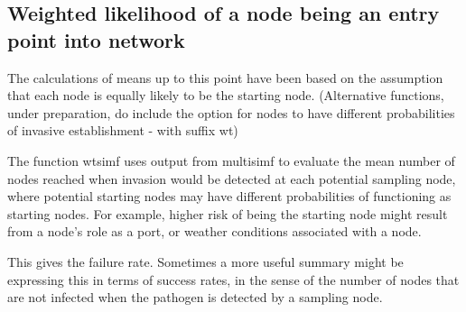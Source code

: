\documentclass[]{article}
\newenvironment{Shaded}{\begin{snugshade}}{\end{snugshade}}
\newcommand{\KeywordTok}[1]{\textcolor[rgb]{0.13,0.29,0.53}{\textbf{#1}}}
\newcommand{\DataTypeTok}[1]{\textcolor[rgb]{0.13,0.29,0.53}{#1}}
\newcommand{\DecValTok}[1]{\textcolor[rgb]{0.00,0.00,0.81}{#1}}
\newcommand{\StringTok}[1]{\textcolor[rgb]{0.31,0.60,0.02}{#1}}
\newcommand{\CommentTok}[1]{\textcolor[rgb]{0.56,0.35,0.01}{\textit{#1}}}
\newcommand{\OtherTok}[1]{\textcolor[rgb]{0.56,0.35,0.01}{#1}}
\newcommand{\ControlFlowTok}[1]{\textcolor[rgb]{0.13,0.29,0.53}{\textbf{#1}}}
\newcommand{\OperatorTok}[1]{\textcolor[rgb]{0.81,0.36,0.00}{\textbf{#1}}}
\newcommand{\NormalTok}[1]{#1}
\begin{document}
\subsection{Weighted likelihood of a node being an entry point into
network}\label{weighted-likelihood-of-a-node-being-an-entry-point-into-network}

The calculations of means up to this point have been based on the
assumption that each node is equally likely to be the starting node.
(Alternative functions, under preparation, do include the option for
nodes to have different probabilities of invasive establishment - with
suffix wt)

The function wtsimf uses output from multisimf to evaluate the mean
number of nodes reached when invasion would be detected at each
potential sampling node, where potential starting nodes may have
different probabilities of functioning as starting nodes. For example,
higher risk of being the starting node might result from a node's role
as a port, or weather conditions associated with a node.

\begin{Shaded}
\end{Shaded}

This gives the failure rate. Sometimes a more useful summary might be
expressing this in terms of success rates, in the sense of the number of
nodes that are not infected when the pathogen is detected by a sampling
node.
\end{document}
